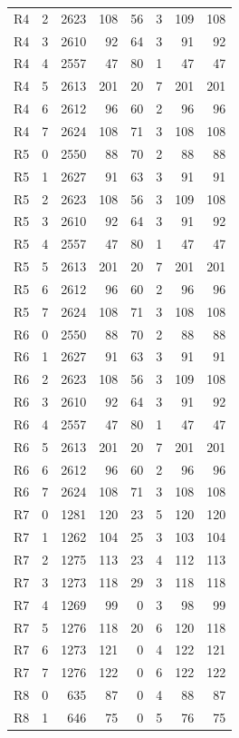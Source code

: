 \begin{longtable}{lrrrrrrr}
R4 & 2 & 2623 & 108 & 56 & 3 & 109 & 108\\
R4 & 3 & 2610 & 92 & 64 & 3 & 91 & 92\\
R4 & 4 & 2557 & 47 & 80 & 1 & 47 & 47\\
R4 & 5 & 2613 & 201 & 20 & 7 & 201 & 201\\
R4 & 6 & 2612 & 96 & 60 & 2 & 96 & 96\\
R4 & 7 & 2624 & 108 & 71 & 3 & 108 & 108\\
R5 & 0 & 2550 & 88 & 70 & 2 & 88 & 88\\
R5 & 1 & 2627 & 91 & 63 & 3 & 91 & 91\\
R5 & 2 & 2623 & 108 & 56 & 3 & 109 & 108\\
R5 & 3 & 2610 & 92 & 64 & 3 & 91 & 92\\
R5 & 4 & 2557 & 47 & 80 & 1 & 47 & 47\\
R5 & 5 & 2613 & 201 & 20 & 7 & 201 & 201\\
R5 & 6 & 2612 & 96 & 60 & 2 & 96 & 96\\
R5 & 7 & 2624 & 108 & 71 & 3 & 108 & 108\\
R6 & 0 & 2550 & 88 & 70 & 2 & 88 & 88\\
R6 & 1 & 2627 & 91 & 63 & 3 & 91 & 91\\
R6 & 2 & 2623 & 108 & 56 & 3 & 109 & 108\\
R6 & 3 & 2610 & 92 & 64 & 3 & 91 & 92\\
R6 & 4 & 2557 & 47 & 80 & 1 & 47 & 47\\
R6 & 5 & 2613 & 201 & 20 & 7 & 201 & 201\\
R6 & 6 & 2612 & 96 & 60 & 2 & 96 & 96\\
R6 & 7 & 2624 & 108 & 71 & 3 & 108 & 108\\
R7 & 0 & 1281 & 120 & 23 & 5 & 120 & 120\\
R7 & 1 & 1262 & 104 & 25 & 3 & 103 & 104\\
R7 & 2 & 1275 & 113 & 23 & 4 & 112 & 113\\
R7 & 3 & 1273 & 118 & 29 & 3 & 118 & 118\\
R7 & 4 & 1269 & 99 & 0 & 3 & 98 & 99\\
R7 & 5 & 1276 & 118 & 20 & 6 & 120 & 118\\
R7 & 6 & 1273 & 121 & 0 & 4 & 122 & 121\\
R7 & 7 & 1276 & 122 & 0 & 6 & 122 & 122\\
R8 & 0 & 635 & 87 & 0 & 4 & 88 & 87\\
R8 & 1 & 646 & 75 & 0 & 5 & 76 & 75\\

\end{longtable}
